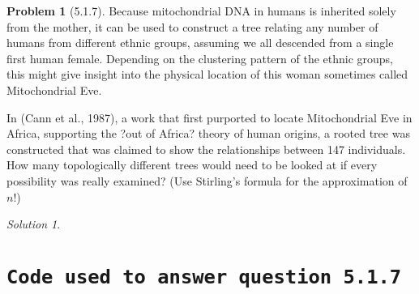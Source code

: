 \documentclass[11pt]{article}
\theoremstyle{definition}\newtheorem*{problem}{Problem}
\theoremstyle{remark}\newtheorem{claim}{Claim}
\theoremstyle{remark}\newtheorem*{sol}{Solution}
\begin{document}
\begin{problem}[5.1.7] 
Because mitochondrial DNA in humans is inherited solely from the mother, it can be used to construct a tree relating any number of humans from different ethnic groups, assuming we all descended from a single first human female. Depending on the clustering pattern of the ethnic groups, this might give insight into the physical location of this woman sometimes called Mitochondrial Eve.

In (Cann et al., 1987), a work that first purported to locate Mitochondrial Eve in Africa, supporting the ?out of Africa? theory of human origins, a rooted tree was constructed that was claimed to show the relationships between 147 individuals. How many topologically different trees would need to be looked at if every possibility was really examined? (Use Stirling's formula for the approximation of $n!$)
\end{problem}

\begin{sol}
\end{sol}


\section{\texttt{Code used to answer question 5.1.7}}
\end{document}
